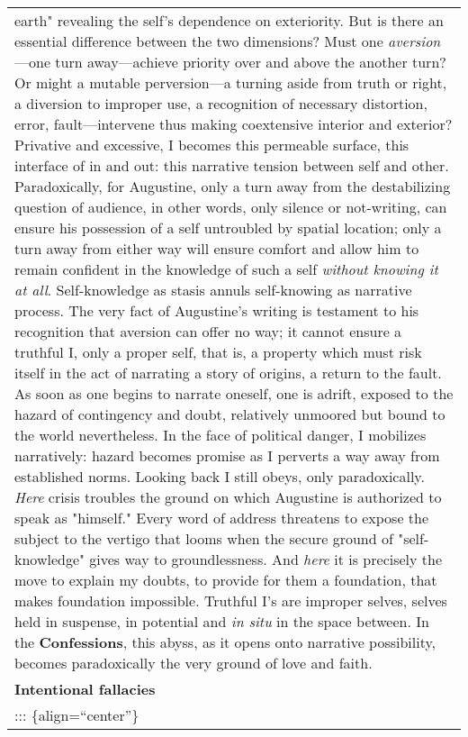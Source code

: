 \begin{longtable}[]{@{}l@{}}
\begin{minipage}[t]{0.97\columnwidth}
earth" revealing the self's dependence on exteriority. But is there an
essential difference between the two dimensions? Must one
\emph{aversion}---one turn away---achieve priority over and above the
another turn? Or might a mutable perversion---a turning aside from truth
or right, a diversion to improper use, a recognition of necessary
distortion, error, fault---intervene thus making coextensive interior
and exterior? Privative and excessive, I becomes this permeable surface,
this interface of in and out: this narrative tension between self and
other. Paradoxically, for Augustine, only a turn away from the
destabilizing question of audience, in other words, only silence or
not-writing, can ensure his possession of a self untroubled by spatial
location; only a turn away from either way will ensure comfort and allow
him to remain confident in the knowledge of such a self \emph{without
knowing it at all}. Self-knowledge as stasis annuls self-knowing as
narrative process. The very fact of Augustine's writing is testament to
his recognition that aversion can offer no way; it cannot ensure a
truthful I, only a proper self, that is, a property which must risk
itself in the act of narrating a story of origins, a return to the
fault. As soon as one begins to narrate oneself, one is adrift, exposed
to the hazard of contingency and doubt, relatively unmoored but bound to
the world nevertheless. In the face of political danger, I mobilizes
narratively: hazard becomes promise as I perverts a way away from
established norms. Looking back I still obeys, only paradoxically.
\emph{Here} crisis troubles the ground on which Augustine is authorized
to speak as "himself." Every word of address threatens to expose the
subject to the vertigo that looms when the secure ground of
"self-knowledge" gives way to groundlessness. And \emph{here} it is
precisely the move to explain my doubts, to provide for them a
foundation, that makes foundation impossible. Truthful I's are improper
selves, selves held in suspense, in potential and \emph{in situ} in the
space between. In the \textbf{Confessions}, this abyss, as it opens onto
narrative possibility, becomes paradoxically the very ground of love and
faith.\strut
\end{minipage}\tabularnewline
\begin{minipage}[t]{0.97\columnwidth}\raggedright
\textbf{Intentional fallacies}\strut
\end{minipage}\tabularnewline
\begin{minipage}[t]{0.97\columnwidth}\raggedright
::: \{align=``center''\}\strut

\end{minipage}
\end{longtable}
